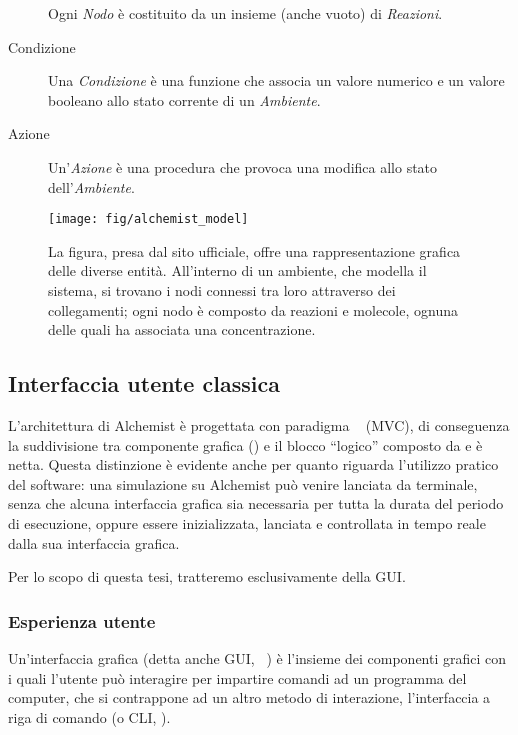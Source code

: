 \begin{description}
                    Ogni \emph{Nodo} è costituito da un insieme (anche vuoto) di \emph{Reazioni}.

                \item[Condizione]\label{itm:cond}
                    Una \emph{Condizione} è una funzione che associa un valore numerico e un valore booleano allo stato corrente di un \emph{Ambiente}.

                \item[Azione]\label{itm:act}
                    Un'\emph{Azione} è una procedura che provoca una modifica allo stato dell'\emph{Ambiente}.

            \end{description}

            \begin{figure}[htbp]
                \centering
                \texttt{[image: fig/alchemist\_model]}
                \caption{%
                    La figura, presa dal sito ufficiale, offre una rappresentazione grafica delle diverse entità.
                    All'interno di un ambiente, che modella il sistema, si trovano i nodi connessi tra loro attraverso dei collegamenti;
                    ogni nodo è composto da reazioni e molecole, ognuna delle quali ha associata una concentrazione.
                }
                \label{fig:model}
            \end{figure}

        \subsection{Interfaccia utente classica}\label{subsec:prevGui}
            L'architettura di Alchemist è progettata con paradigma ~\cite{mvc} (MVC), di conseguenza la suddivisione tra componente grafica () e il blocco ``logico'' composto da  e  è netta.
            Questa distinzione è evidente anche per quanto riguarda l'utilizzo pratico del software:
            una simulazione su Alchemist può venire lanciata da terminale, senza che alcuna interfaccia grafica sia necessaria per tutta la durata del periodo di esecuzione, oppure essere inizializzata, lanciata e controllata in tempo reale dalla sua interfaccia grafica.

            Per lo scopo di questa tesi, tratteremo esclusivamente della GUI.

            \subsubsection{Esperienza utente}\label{subsubsec:prevUx}
                Un'interfaccia grafica (detta anche GUI, ~\cite{gui}) è l'insieme dei componenti grafici con i quali l'utente può interagire per impartire comandi ad un programma del computer, che si contrappone ad un altro metodo di interazione, l'interfaccia a riga di comando (o CLI, ).

